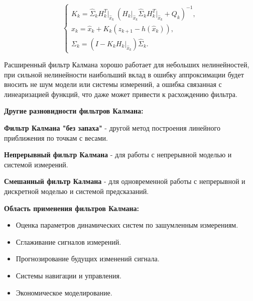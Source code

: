 \documentclass[12pt, a4paper]{article}
\begin{document}
\begin{equation}
\begin{cases}
K_k = \widehat{\Sigma}_k H_k^T\big|_{\widehat{x}_k} \:(H_k\big|_{\widehat{x}_k} \widehat{\Sigma}_k H_k^T\big|_{\widehat{x}_k} + Q_k)^{-1}, \\
x_k = \widehat{x}_{k} + K_k(z_{k+1} - h( \widehat{x}_{k})), \\
\Sigma_k = (I - K_k H_k\big|_{\widehat{x}_k})\widehat{\Sigma}_k.
\end{cases}
\end{equation}

Расширенный фильтр Калмана хорошо работает для небольших нелинейностей, при сильной нелинейности наибольший вклад в ошибку аппроксимации будет вносить не шум модели или системы измерений, а ошибка связанная с линеаризацией функций, что даже может привести к расхождению фильтра.


\newpage
\begin{flushleft}
\textbf{Другие разновидности фильтров Калмана:}
\end{flushleft}

\textbf{Фильтр Калмана "без запаха"} - другой метод построения линейного приближения по точкам с весами.

\textbf{Непрерывный фильтр Калмана} - для работы с непрерывной моделью и системой измерений.

\textbf{Смешанный фильтр Калмана} - для одновременной работы с непрерывной и дискретной моделью и системой предсказаний.

\begin{flushleft}
\textbf{Область применения фильтров Калмана:}
\end{flushleft}

\begin{itemize}
\item Оценка параметров динамических систем по зашумленным измерениям.
\item Сглаживание сигналов измерений.
\item Прогнозирование будущих изменений сигнала.
\item Системы навигации и управления.
\item Экономическое моделирование.
\end{itemize}
\end{document}
